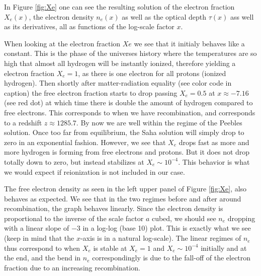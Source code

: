 \documentclass[twocolumn]{aastex62}
\begin{document}
In Figure \ref{fig:Xe} one can see the resulting solution of the electron fraction $X_e(x)$, the electron density $n_e(x)$ as well as the optical depth $\tau(x)$ ass well as its derivatives, all as functions of the log-scale factor $x$. 

When looking at the electron fraction $Xe$ we see that it initialy behaves like a constant. This is the phase of the universes history where the temperatures are so high that almost all hydrogen will be instantly ionized, therefore yielding a electron fraction $X_e = 1$, as there is one electron for all protons (ionized hydrogen). Then shortly after matter-radiation equality (see color code in caption) the free electron fraction starts to drop passing $X_e = 0.5$ at $x \approx -7.16$ (see red dot) at which time there is double the amount of hydrogen compared to free electrons. This corresponds to when we have recombination, and corresponds to a redshift $z \approx 1285.7$. By now we are well within the regime of the Peebles solution. Once too far from equilibrium, the Saha solution will simply drop to zero in an exponential fashion. However, we see that $X_e$ drops fast as more and more hydrogen is forming from free electrons and protons. But it does not drop totally down to zero, but instead stabilizes at $X_e \sim 10^{-4}$. This behavior is what we would expect if reionization is not included in our case. 

The free electron density as seen in the left upper panel of Figure \ref{fig:Xe}, also behaves as expected. We see that in the two regimes before and after around recombination, the graph behaves linearly. Since the electron density is proportional to the inverse of the scale factor $a$ cubed, we should see $n_e$ dropping with a linear slope of $-3$ in a log-log (base 10) plot. This is exactly what we see (keep in mind that the $x$-axis is in a natural log-scale). The linear regimes of $n_e$ thus correspond to when $X_e$ is stable at $X_e = 1$ and $X_e\sim 10^{-4}$ initially and at the end, and the bend in $n_e$ correspondingly is due to the fall-off of the electron fraction due to an increasing recombination. 
\end{document}
